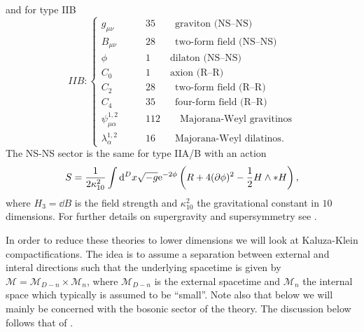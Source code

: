 and for type IIB
\begin{equation*}
    IIB: \begin{cases}
                g_{\mu\nu} \qquad &35 \qquad \text{graviton (NS--NS)}\\
                B_{\mu\nu} \qquad &28 \qquad  \text{two-form field (NS--NS)}\\
                \phi\qquad &1 \qquad  \text{dilaton (NS--NS)}\\
                C_{0}\qquad &1 \qquad  \text{axion (R--R)}\\
                C_{2}\qquad & 28 \qquad  \text{two-form field  (R--R)}\\
                C_{4}\qquad & 35 \qquad  \text{four-form field  (R--R)}\\
                \psi_{\mu\alpha}^{1,2}\qquad &112\qquad \text{Majorana-Weyl gravitinos}\\
                \lambda_\alpha^{1,2} \qquad &16\qquad \text{Majorana-Weyl dilatinos}.
          \end{cases}
\end{equation*}
The NS-NS sector is the same for type IIA/B with an action
\begin{equation*}
    S = \frac{1}{2\kappa_{10}^2}\int \mathrm{d} ^Dx \sqrt{-g}\mathrm{e}^{-2\phi}\left(R+4(\partial\phi)^2-\frac{1}{2}H\wedge*H\right),
\end{equation*}
where $H_3=\dd B$ is the field strength and $\kappa_{10}^2$ the gravitational constant in $10$ dimensions. For further details on supergravity and supersymmetry see \cite{HokerSugra2002}. 

In order to reduce these theories to lower dimensions we will look at Kaluza-Klein compactifications. The idea is to assume a separation between external and interal directions such that the underlying spacetime is given by $\mathcal{M}=\mathcal{M}_{D-n}\times\mathcal{M}_n$, where $\mathcal{M}_{D-n}$ is the external spacetime and $\mathcal{M}_n$ the internal space which typically is assumed to be ``small''. Note also that below we will mainly be concerned with the bosonic sector of the theory. The discussion below follows that of \cite{PopeKaluzaKlein}.

